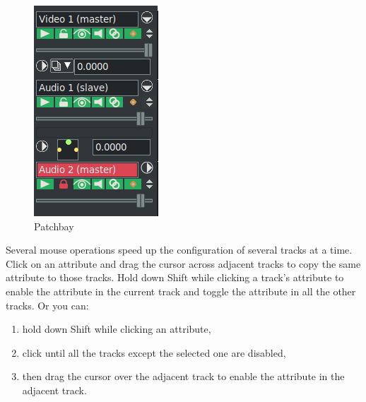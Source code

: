 \begin{figure}
    \vspace{-2ex}
    \centering
    \includegraphics[width=0.79\linewidth]{images/patchbay01.png}
    \caption{Patchbay}
    \label{fig:patchbay01}
\end{figure}


Several mouse operations speed up the configuration of several tracks at a time. Click on an attribute and drag the cursor across adjacent tracks to copy the same attribute to those tracks.  Hold down Shift while clicking a track's attribute to enable the attribute in the current track and toggle the attribute in all the other tracks. Or you can:

\begin{enumerate}
    \item hold down Shift while clicking an attribute,
    \item click until all the tracks except the selected one are disabled,
    \item then drag the cursor over the adjacent track to enable the attribute in the adjacent track.
\end{enumerate}

